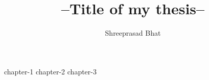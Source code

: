 \documentclass[a4paper,twoside]{iiththesis}
\title{--Title of my thesis--}
\author{Shreeprasad Bhat}
\begin{document}
{chapter-1}
{chapter-2}
{chapter-3}

\clearpage
\newpage
{} %
\end{document}
